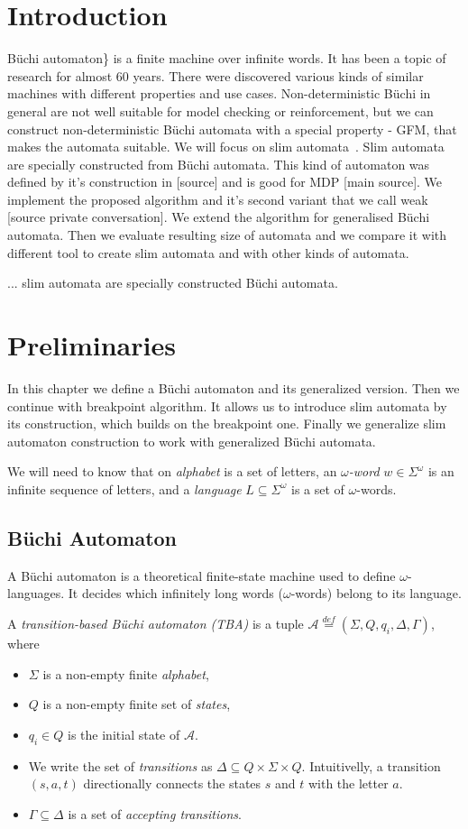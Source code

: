 \documentclass[
	digital
nolof, nolot
]{fithesis3}
\newcommand{\cA}{\mathcal{A}}
\newcommand{\eqdef}{\overset{def}{=}}
\begin{document}
	\chapter{Introduction}
	Büchi automaton\cite{textbook}\} is a finite machine over infinite words. It has been a topic of research for almost 60 years.
	There were discovered various kinds of similar machines with different properties and use cases.
	Non-deterministic Büchi in general are not well suitable for model checking or reinforcement, but we can construct non-deterministic Büchi automata with a special property - GFM, that makes the automata suitable. We will focus on slim automata~\cite{hlavni}.
	Slim automata are specially constructed from Büchi automata. This kind of automaton was defined by it's construction in [source] and is good for MDP [main source]. We implement the proposed algorithm and it's second variant that we call weak [source private conversation]. We extend the algorithm for generalised Büchi automata. Then we evaluate resulting size of automata and we compare it with different tool to create slim automata and with other kinds of automata.
	
	
	... slim automata are specially constructed Büchi automata.
	\chapter{Preliminaries}
		In this chapter we define a Büchi automaton and its generalized version.
		Then we continue with breakpoint algorithm. It allows us to introduce slim automata by its construction, which builds on the breakpoint one. Finally we generalize slim automaton construction to work with generalized Büchi automata.
		
		We will need to know that on \emph{alphabet} is a set of letters, an \emph{$\omega$-word} $w \in \Sigma^\omega$ is an infinite sequence of letters, and a \emph{language} $L \subseteq \Sigma^\omega$ is a set of $\omega$-words.
		\section{Büchi Automaton}
			A Büchi automaton is a theoretical finite-state machine used to define $\omega$-languages. It decides which infinitely long words ($\omega$-words) belong to its language.
			
			A \emph{transition-based Büchi automaton (TBA)} is a tuple $\cA\eqdef(\Sigma, Q, q_i, \Delta, \Gamma)$, where 
			\begin{itemize}
				\item $\Sigma$ is a non-empty finite \emph{alphabet},
				\item $Q$ is a non-empty finite set of \emph{states},
				\item $q_i \in Q$ is the initial state of $\cA$.
				\item We write the set of \emph{transitions} as $\Delta \subseteq Q \times \Sigma \times Q$. Intuitivelly, a transition $(s, a, t)$  directionally connects the states $s$ and $t$ with the letter $a$.
				\item $\Gamma \subseteq \Delta$ is a set of \emph{accepting transitions}.
			\end{itemize}
			
\end{document}
